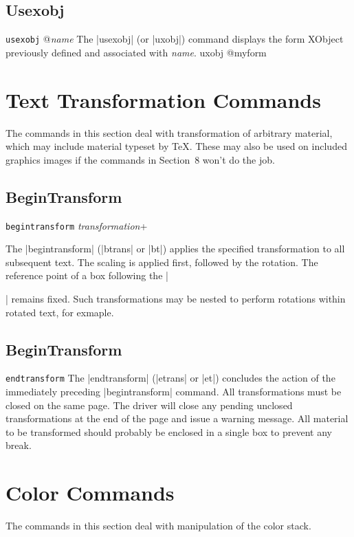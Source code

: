 {\subsection{Usexobj}
\syntax
{\tt usexobj} @{\it name}
\description
The |usexobj| (or |uxobj|) command displays the 
form XObject previously defined and
associated with {\it name}.
\example
\begintt
uxobj @myform
\endtt

\section{Text Transformation Commands}
The commands in this section deal with transformation
of arbitrary material, which may include
material typeset by \TeX.  These
may also be used on included graphics images
if the commands in Section~8 won't do the job.

\subsection{BeginTransform}
\syntax
{\tt begintransform} {\it transformation}+

\description
The |begintransform| (|btrans| or |bt|) applies
the specified transformation to all subsequent text.
The scaling is applied first, followed by the rotation.
The reference point of a box following
the |\special| remains fixed.  Such transformations
may be nested to perform rotations within rotated text, for exmaple.

\example
\begintt
{}
\endtt

\subsection{BeginTransform}
\syntax
{\tt endtransform}
\description
The |endtransform| (|etrans| or |et|) concludes
the action of the immediately preceding |begintransform|
command.  All transformations must be closed
on the same page.  The driver will close
any pending unclosed transformations at the
end of the page and issue a warning message.
All material to be transformed
should probably be enclosed in a single box
to prevent any break.
\example
\begintt
{}
\endtt


\section{Color Commands}
The commands in this section deal with manipulation of the color
stack.

}

